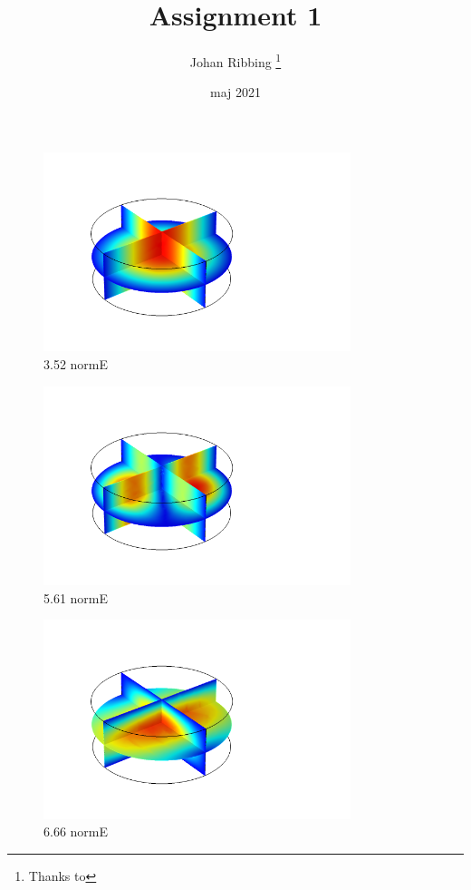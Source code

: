 \documentclass[a4paper]{article}
\title{Assignment 1}
\author{Johan Ribbing \thanks{Thanks to}}
\date{maj 2021}
\begin{document}
\begin{titlepage}
\maketitle
\end{titlepage}

\begin{figure}[h]
	\centering
	\includegraphics[width=0.8\textwidth]{3_52_normE.png}
	\caption{3.52 normE}
	\label{fig:352norme}
\end{figure}

\begin{figure}[h]
	\centering
	\includegraphics[width=0.8\textwidth]{5_61_normE.png}
	\caption{5.61 normE}
	\label{fig:561norme}
\end{figure}

\begin{figure}[h]
	\centering
	\includegraphics[width=0.8\textwidth]{6_66_normE.png}
	\caption{6.66 normE}
	\label{fig:666norme}
\end{figure}
\end{document}
